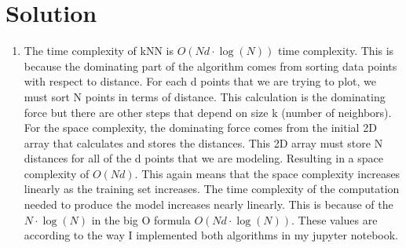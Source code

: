 \documentclass[submit]{harvardml}
\newenvironment{solution}
  {\color{blue}\section*{Solution}}
{}
\begin{document}
\begin{solution}
\begin{enumerate}
        \item The time complexity of kNN is $O(Nd \cdot \log(N))$ time complexity. This is because the dominating part of the algorithm comes from sorting data points with respect to distance. For each d points that we are trying to plot, we must sort N points in terms of distance. This calculation is the dominating force but there are other steps that depend on size k (number of neighbors). For the space complexity, the dominating force comes from the initial 2D array that calculates and stores the distances. This 2D array must store N distances for all of the d points that we are modeling. Resulting in a space complexity of $O(Nd)$. This again means that the space complexity increases linearly as the training set increases. The time complexity of the computation needed to produce the model increases nearly linearly. This is because of the $N \cdot \log(N)$ in the big O formula $O(N d\cdot \log(N))$. These values are according to the way I implemented both algorithms in my jupyter notebook. 
	\end{enumerate}
\end{solution}


\end{document}
